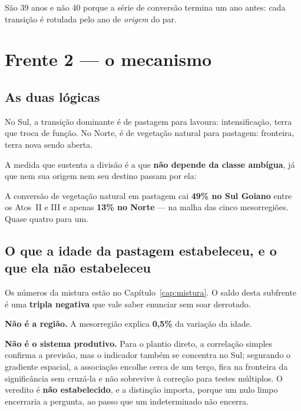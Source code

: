 \begin{armadilha}
São 39 anos e não 40 porque a série de conversão termina um ano antes: cada
transição é rotulada pelo ano de \emph{origem} do par.
\end{armadilha}

\chapter{Frente 2 --- o mecanismo}

\section{As duas lógicas}

No Sul, a transição dominante é de pastagem para lavoura: intensificação, terra
que troca de função. No Norte, é de vegetação natural para pastagem: fronteira,
terra nova sendo aberta.

A medida que sustenta a divisão é a que \textbf{não depende da classe ambígua},
já que nem sua origem nem seu destino passam por ela:

\begin{ancora}
A conversão de vegetação natural em pastagem cai \textbf{49\% no Sul Goiano}
entre os Atos~II e III e apenas \textbf{13\% no Norte} --- na malha das cinco
mesorregiões. Quase quatro para um.
\end{ancora}

\section{O que a idade da pastagem estabeleceu, e o que ela não estabeleceu}

Os números da mistura estão no Capítulo~\ref{cap:mistura}. O saldo desta
subfrente é uma \textbf{tripla negativa} que vale saber enunciar sem soar
derrotado.

\vspace{4pt}
\textbf{Não é a região.} A mesorregião explica \textbf{0,5\%} da variação da
idade.

\textbf{Não é o sistema produtivo.} Para o plantio direto, a correlação simples
confirma a previsão, mas o indicador também se concentra no Sul; segurando o
gradiente espacial, a associação encolhe cerca de um terço, fica na fronteira da
significância sem cruzá-la e não sobrevive à correção para testes múltiplos. O
veredito é \textbf{não estabelecido}, e a distinção importa, porque um nulo
limpo encerraria a pergunta, ao passo que um indeterminado não encerra.

